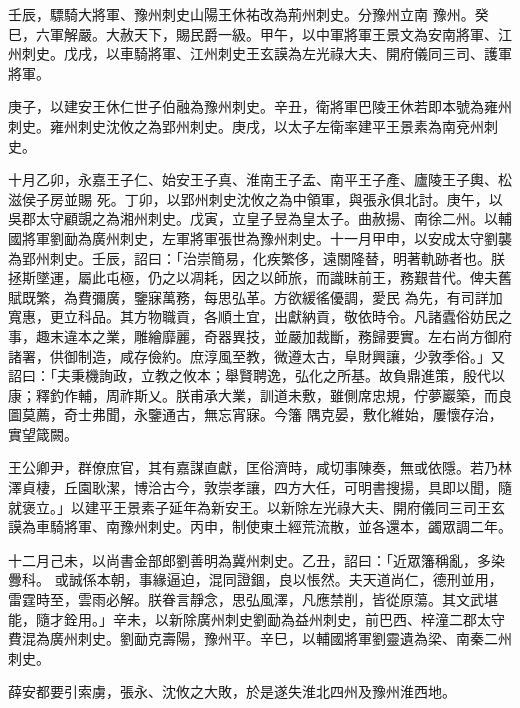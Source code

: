 \begin{pinyinscope}
 壬辰，驃騎大將軍、豫州刺史山陽王休祐改為荊州刺史。分豫州立南
 豫州。癸巳，六軍解嚴。大赦天下，賜民爵一級。甲午，以中軍將軍王景文為安南將軍、江州刺史。戊戌，以車騎將軍、江州刺史王玄謨為左光祿大夫、開府儀同三司、護軍將軍。



 庚子，以建安王休仁世子伯融為豫州刺史。辛丑，衛將軍巴陵王休若即本號為雍州刺史。雍州刺史沈攸之為郢州刺史。庚戌，以太子左衛率建平王景素為南兗州刺史。



 十月乙卯，永嘉王子仁、始安王子真、淮南王子孟、南平王子產、廬陵王子輿、松滋侯子房並賜
 死。丁卯，以郢州刺史沈攸之為中領軍，與張永俱北討。庚午，以吳郡太守顧覬之為湘州刺史。戊寅，立皇子昱為皇太子。曲赦揚、南徐二州。以輔國將軍劉勔為廣州刺史，左軍將軍張世為豫州刺史。十一月甲申，以安成太守劉襲為郢州刺史。壬辰，詔曰：「治崇簡易，化疾繁侈，遠關隆替，明著軌跡者也。朕拯斯墜運，屬此屯極，仍之以凋耗，因之以師旅，而識昧前王，務艱昔代。俾夫舊賦既繁，為費彌廣，鑒寐萬務，每思弘革。方欲緩徭優調，愛民
 為先，有司詳加寬惠，更立科品。其方物職貢，各順土宜，出獻納貢，敬依時令。凡諸蠹俗妨民之事，趣末違本之業，雕繪靡麗，奇器異技，並嚴加裁斷，務歸要實。左右尚方御府諸署，供御制造，咸存儉約。庶淳風至教，微遵太古，阜財興讓，少敦季俗。」又詔曰：「夫秉機詢政，立教之攸本；舉賢聘逸，弘化之所基。故負鼎進策，殷代以康；釋釣作輔，周祚斯乂。朕甫承大業，訓道未敷，雖側席忠規，佇夢巖築，而良圖莫薦，奇士弗聞，永鑒通古，無忘宵寐。今籓
 隅克晏，敷化維始，屢懷存治，實望箴闕。



 王公卿尹，群僚庶官，其有嘉謀直獻，匡俗濟時，咸切事陳奏，無或依隱。若乃林澤貞棲，丘園耿潔，博洽古今，敦崇孝讓，四方大任，可明書搜揚，具即以聞，隨就褒立。」以建平王景素子延年為新安王。以新除左光祿大夫、開府儀同三司王玄謨為車騎將軍、南豫州刺史。丙申，制使東土經荒流散，並各還本，蠲眾調二年。



 十二月己未，以尚書金部郎劉善明為冀州刺史。乙丑，詔曰：「近眾籓稱亂，多染釁科。
 或誠係本朝，事緣逼迫，混同證錮，良以悵然。夫天道尚仁，德刑並用，雷霆時至，雲雨必解。朕眷言靜念，思弘風澤，凡應禁削，皆從原蕩。其文武堪能，隨才銓用。」辛未，以新除廣州刺史劉勔為益州刺史，前巴西、梓潼二郡太守費混為廣州刺史。劉勔克壽陽，豫州平。辛巳，以輔國將軍劉靈遺為梁、南秦二州刺史。



 薛安都要引索虜，張永、沈攸之大敗，於是遂失淮北四州及豫州淮西地。




\end{pinyinscope}
